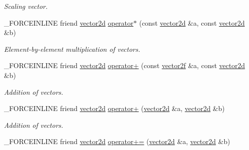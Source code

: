 \begin{DoxyCompactItemize}
\begin{DoxyCompactList}\small\item\em Scaling vector. \end{DoxyCompactList}\item 
\hypertarget{classbt_1_1vector2d_a4139ad92ad3622d1315fe8e81cbc9339}{\-\_\-\-F\-O\-R\-C\-E\-I\-N\-L\-I\-N\-E friend \hyperlink{classbt_1_1vector2d}{vector2d} \hyperlink{classbt_1_1vector2d_a4139ad92ad3622d1315fe8e81cbc9339}{operator$\ast$} (const \hyperlink{classbt_1_1vector2d}{vector2d} \&a, const \hyperlink{classbt_1_1vector2d}{vector2d} \&b)}\label{classbt_1_1vector2d_a4139ad92ad3622d1315fe8e81cbc9339}

\begin{DoxyCompactList}\small\item\em Element-\/by-\/element multiplication of vectors. \end{DoxyCompactList}\item 
\hypertarget{classbt_1_1vector2d_ad1643cdd8fa804539f6319ca670ab7e7}{\-\_\-\-F\-O\-R\-C\-E\-I\-N\-L\-I\-N\-E friend \hyperlink{classbt_1_1vector2d}{vector2d} \hyperlink{classbt_1_1vector2d_ad1643cdd8fa804539f6319ca670ab7e7}{operator+} (const \hyperlink{classbt_1_1vector2f}{vector2f} \&a, const \hyperlink{classbt_1_1vector2d}{vector2d} \&b)}\label{classbt_1_1vector2d_ad1643cdd8fa804539f6319ca670ab7e7}

\begin{DoxyCompactList}\small\item\em Addition of vectors. \end{DoxyCompactList}\item 
\hypertarget{classbt_1_1vector2d_a1e47eab42d616d79cca036527bac8a5b}{\-\_\-\-F\-O\-R\-C\-E\-I\-N\-L\-I\-N\-E friend \hyperlink{classbt_1_1vector2d}{vector2d} \hyperlink{classbt_1_1vector2d_a1e47eab42d616d79cca036527bac8a5b}{operator+} (\hyperlink{classbt_1_1vector2d}{vector2d} \&a, \hyperlink{classbt_1_1vector2d}{vector2d} \&b)}\label{classbt_1_1vector2d_a1e47eab42d616d79cca036527bac8a5b}

\begin{DoxyCompactList}\small\item\em Addition of vectors. \end{DoxyCompactList}\item 
\hypertarget{classbt_1_1vector2d_a2acec776bfa183a6b2e534b90e0f1270}{\-\_\-\-F\-O\-R\-C\-E\-I\-N\-L\-I\-N\-E friend \hyperlink{classbt_1_1vector2d}{vector2d} \hyperlink{classbt_1_1vector2d_a2acec776bfa183a6b2e534b90e0f1270}{operator+=} (\hyperlink{classbt_1_1vector2d}{vector2d} \&a, \hyperlink{classbt_1_1vector2d}{vector2d} \&b)}\label{classbt_1_1vector2d_a2acec776bfa183a6b2e534b90e0f1270}


\end{DoxyCompactItemize}
